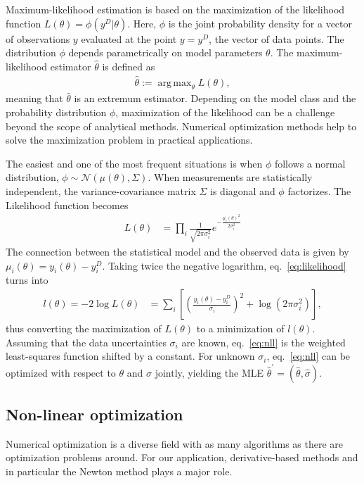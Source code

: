 \documentclass[article]{jss}
\DeclareMathOperator*{\argmax}{arg\,max}
\begin{document}
Maximum-likelihood estimation is based on the maximization of the likelihood function $L(\theta) = \phi(y^D|\theta)$. Here, $\phi$ is the joint probability density for a vector of observations $y$ evaluated at the point $y = y^D$, the vector of data points. The distribution $\phi$ depends parametrically on model parameters $\theta$. The maximum-likelihood estimator $\hat\theta$ is defined as
\begin{align*}
	\hat \theta := \argmax_{\theta} L(\theta),
\end{align*}
meaning that $\hat\theta$ is an extremum estimator. Depending on the model class and the probability distribution $\phi$, maximization of the likelihood can be a challenge beyond the scope of analytical methods. Numerical optimization methods help to solve the maximization problem in practical applications.

The easiest and one of the most frequent situations is when $\phi$ follows a normal distribution, $\phi\sim\mathcal N(\mu(\theta), \Sigma)$. When measurements are statistically independent, the variance-covariance matrix $\Sigma$ is diagonal and $\phi$ factorizes. The Likelihood function becomes
\begin{align}
	L(\theta) &= \prod_i \frac{1}{\sqrt{2\pi\sigma_i^2}} e^{-\frac{\mu_i(\theta)^2}{2\sigma_i^2}} 
	\label{eq:likelihood}
\end{align}
The connection between the statistical model and the observed data is given by $\mu_i(\theta) = y_i(\theta) - y_i^D$. Taking twice the negative logarithm, eq.~\eqref{eq:likelihood} turns into
\begin{align}
	l(\theta) = -2\log L(\theta) &= \sum_i \left[\left(\frac{y_i(\theta) - y_i^D}{\sigma_i}\right)^2 + \log(2\pi\sigma_i^2)\right],
	\label{eq:nll}
\end{align}
thus converting the maximization of $L(\theta)$ to a minimization of $l(\theta)$. 
Assuming that the data uncertainties $\sigma_i$ are known, eq.~\eqref{eq:nll} is the weighted least-squares function shifted by a constant. For unknown $\sigma_i$, eq.~\eqref{eq:nll} can be optimized with respect to $\theta$ and $\sigma$ jointly, yielding the MLE $\hat\theta^{\prime} = (\hat\theta, \hat\sigma)$.

\subsection{Non-linear optimization}

Numerical optimization is a diverse field with as many algorithms as there are optimization problems around. For our application, derivative-based methods and in particular the Newton method plays a major role.
\end{document}

